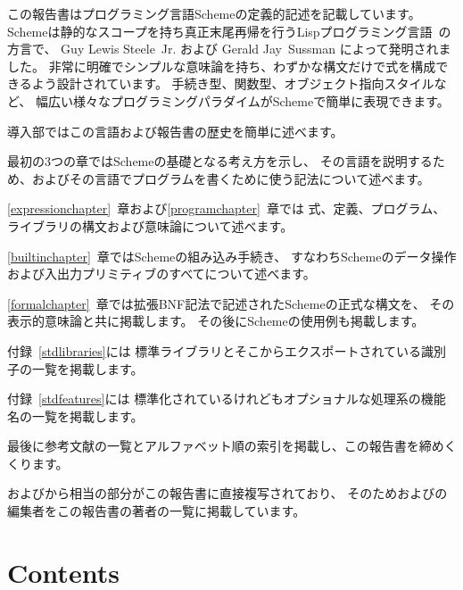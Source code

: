 この報告書はプログラミング言語Schemeの定義的記述を記載しています。
Schemeは静的なスコープを持ち真正末尾再帰を行うLispプログラミング言語~\cite{McCarthy}の方言で、
Guy Lewis Steele~Jr. および Gerald Jay~Sussman によって発明されました。
非常に明確でシンプルな意味論を持ち、わずかな構文だけで式を構成できるよう設計されています。
手続き型、関数型、オブジェクト指向スタイルなど、
幅広い様々なプログラミングパラダイムがSchemeで簡単に表現できます。

\vest 導入部ではこの言語および報告書の歴史を簡単に述べます。

\vest 最初の3つの章ではSchemeの基礎となる考え方を示し、
その言語を説明するため、およびその言語でプログラムを書くために使う記法について述べます。

\vest \ref{expressionchapter}~章および\ref{programchapter}~章では
式、定義、プログラム、ライブラリの構文および意味論について述べます。

\vest \ref{builtinchapter}~章ではSchemeの組み込み手続き、
すなわちSchemeのデータ操作および入出力プリミティブのすべてについて述べます。

\vest \ref{formalchapter}~章では拡張BNF記法で記述されたSchemeの正式な構文を、
その表示的意味論と共に掲載します。
その後にSchemeの使用例も掲載します。

\vest 付録~\ref{stdlibraries}には
標準ライブラリとそこからエクスポートされている識別子の一覧を掲載します。

\vest 付録~\ref{stdfeatures}には
標準化されているけれどもオプショナルな処理系の機能名の一覧を掲載します。


\vest 最後に参考文献の一覧とアルファベット順の索引を掲載し、この報告書を締めくくります。

\begin{note}
\rfivers{}および\rsixrs{}から相当の部分がこの報告書に直接複写されており、
そのため\rfivers{}および\rsixrs{}の編集者をこの報告書の著者の一覧に掲載しています。
\end{note}


\vfill
\eject

\chapter*{Contents}
\addvspace{3.5pt}                  %
\renewcommand{\tocshrink}{-3.5pt}  %
{\footnotesize
\tableofcontents
}

\vfill
\eject
